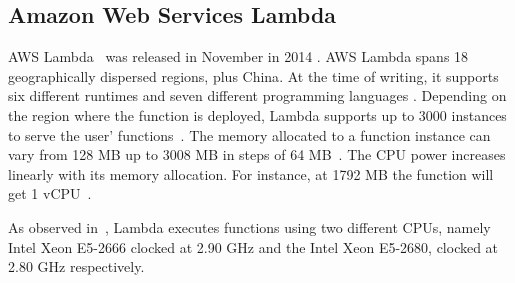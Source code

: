 
\subsection{Amazon Web Services Lambda}\label{sec:ss:aws}

\gls{AWS} Lambda~\cite{AWSLambda} was released in November in 2014 \cite{AWSLambdaRelease}. 
\gls{AWS} Lambda spans 18 geographically dispersed regions, plus China\cite{AWSRegions}. 
At the time of writing, it supports six different runtimes and seven different programming languages \cite{AWSLambdaLanguages}. 
Depending on the region where the function is deployed, Lambda supports up to 3000 instances to serve the user' functions~\cite{AWSLambdaScaling}. 
The memory allocated to a function instance can vary from 128 \gls{MB} up to 3008 \gls{MB} in steps of 64 \gls{MB}~\cite{AWSLambdaConfig}. 
The \gls{CPU} power increases linearly with its memory allocation.
For instance, at 1792 \gls{MB} the function will get 1 \gls{vCPU}~\cite{AWSLambdaConfig}. %

As observed in~\cite{216063}, Lambda executes functions using two different \gls{CPU}s, namely Intel Xeon E5-2666 clocked at 2.90 \gls{GHz}  and the Intel Xeon E5-2680, clocked at 2.80 \gls{GHz} respectively. 

